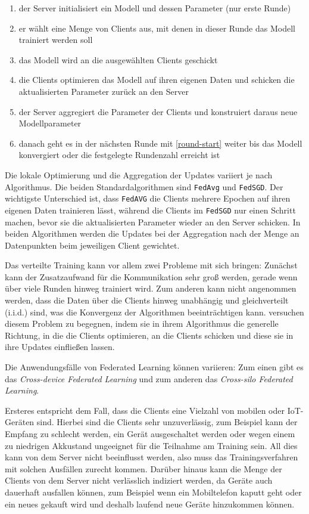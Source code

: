 \begin{enumerate}
	\item der Server initialisiert ein Modell und dessen Parameter (nur erste Runde) 
	\item \label{round-start} er wählt eine Menge von Clients aus, mit denen in dieser Runde das Modell trainiert werden soll
	\item das Modell wird an die ausgewählten Clients geschickt
	\item die Clients optimieren das Modell auf ihren eigenen Daten und schicken die aktualisierten Parameter zurück an den Server
	\item der Server aggregiert die Parameter der Clients und konstruiert daraus neue Modellparameter
	\item danach geht es in der nächsten Runde mit \autoref{round-start} weiter bis das Modell konvergiert oder die festgelegte Rundenzahl erreicht ist
\end{enumerate}

Die lokale Optimierung und die Aggregation der Updates variiert je nach Algorithmus. Die beiden Standardalgorithmen sind \texttt{FedAvg} und \texttt{FedSGD}\cite{mcmahan:2016}. Der wichtigste Unterschied ist, dass \texttt{FedAVG} die Clients mehrere Epochen auf ihren eigenen Daten trainieren lässt, während die Clients im \texttt{FedSGD} nur einen Schritt machen, bevor sie die aktualisierten Parameter wieder an den Server schicken. In beiden Algorithmen werden die Updates bei der Aggregation nach der Menge an Datenpunkten beim jeweiligen Client gewichtet.

Das verteilte Training kann vor allem zwei Probleme mit sich bringen: Zunächst kann der Zusatzaufwand für die Kommunikation sehr groß werden, gerade wenn über viele Runden hinweg trainiert wird. Zum anderen kann nicht angenommen werden, dass die Daten über die Clients hinweg unabhängig und gleichverteilt (i.i.d.) sind, was die Konvergenz der Algorithmen beeinträchtigen kann. \textcite{karimireddy:2020} versuchen diesem Problem zu begegnen, indem sie in ihrem Algorithmus die generelle Richtung, in die die Clients optimieren, an die Clients schicken und diese sie in ihre Updates einfließen lassen.

Die Anwendungsfälle von Federated Learning können variieren: Zum einen gibt es das \textit{Cross-device Federated Learning} und zum anderen das \textit{Cross-silo Federated Learning}\cite{kairouz:2021}. 

Ersteres entspricht dem Fall, dass die Clients eine Vielzahl von mobilen oder IoT-Geräten sind. Hierbei sind die Clients sehr unzuverlässig, zum Beispiel kann der Empfang zu schlecht werden, ein Gerät ausgeschaltet werden oder wegen einem zu niedrigen Akkustand ungeeignet für die Teilnahme am Training sein. All dies kann von dem Server nicht beeinflusst werden, also muss das Trainingsverfahren mit solchen Ausfällen zurecht kommen. Darüber hinaus kann die Menge der Clients von dem Server nicht verlässlich indiziert werden, da Geräte auch dauerhaft ausfallen können, zum Beispiel wenn ein Mobiltelefon kaputt geht oder ein neues gekauft wird und deshalb laufend neue Geräte hinzukommen können.

